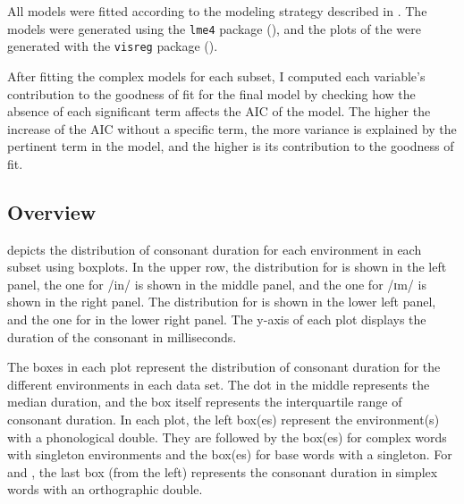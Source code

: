 All models were fitted according to the modeling strategy described in .  
The models were generated using the \texttt{lme4} package (\citealt{Bates.2014}), and the plots of the  were generated with the \texttt{visreg} package (\citealt{Breheny.2015}). 

After fitting the complex models for each subset, I computed each variable's contribution to the goodness of fit for the final model by checking how the absence of each significant term affects the AIC of the model. The higher the increase of the AIC without a specific term, the more variance is explained by the pertinent term in the model, and the higher is its contribution to the goodness of fit.

\subsection{Overview}\largerpage[-1]
 depicts the distribution of consonant duration for each environment in each subset using boxplots. In the upper row, the distribution for  is shown in the left panel, the one for /in/
is shown in the middle panel, and the one for /ɪm/  is shown in the right panel. The distribution for  is shown in the lower left panel, and the one for  in the lower right panel.
The y-axis of each plot displays the duration of the consonant in milliseconds. 

The boxes in each plot represent the distribution of consonant duration for the different environments in each data set. The dot in the middle represents the median duration, and the box itself represents the interquartile range of consonant duration. 
In each plot, the left box(es) represent the environment(s) with a phonological double. They are followed by the box(es) for  complex words with singleton environments and the box(es) for base words with a singleton. For  and , the last box (from the left) represents the consonant duration in simplex words with an orthographic double.


